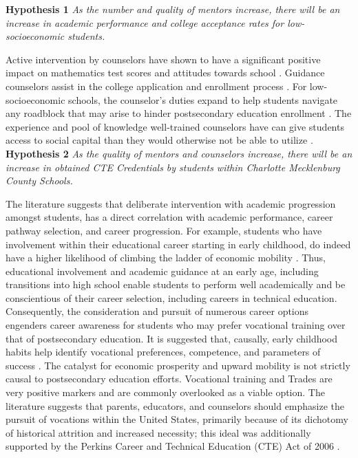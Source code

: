 \textbf{Hypothesis 1} \textit{As the number and quality of mentors increase, there will be an increase in academic performance and college acceptance rates for low-socioeconomic students.}

Active intervention by counselors have shown to have a significant positive impact on mathematics test scores and attitudes towards school \parencite[][]{lee1993}. 
Guidance counselors assist in the college application and enrollment process \parencite[][]{deslonde2018high,tang2019high}.
For low-socioeconomic schools, the counselor's duties expand to help students navigate any roadblock that may arise to hinder postsecondary education enrollment \parencite{farmer2006, deslonde2018high}. 
The experience and pool of knowledge well-trained counselors have can give students access to social capital than they would otherwise not be able to utilize \parencite{tang2019high}.
\\


\textbf{Hypothesis 2} \textit{As the quality of mentors and counselors increase, there will be an increase in obtained CTE Credentials by students within Charlotte Mecklenburg County Schools.}

The literature suggests that deliberate intervention with academic progression amongst students, has a direct correlation with academic performance, career pathway selection, and career progression. 
For example, students who have involvement within their educational career starting in early childhood, do indeed have a higher likelihood of climbing the ladder of economic mobility \parencite[][]{magnuson2000}.
Thus, educational involvement and academic guidance at an early age, including transitions into high school enable students to perform well academically and be conscientious of their career selection, including careers in technical education. 
Consequently, the consideration and pursuit of numerous career options engenders career awareness for students who may prefer vocational training over that of postsecondary education. 
It is suggested that, causally, early childhood habits help identify vocational preferences, competence, and parameters of success \parencite[][]{magnuson2000}.
The catalyst for economic prosperity and upward mobility is not strictly causal to postsecondary education efforts. 
Vocational training and Trades are very positive markers and are commonly overlooked as a viable option. 
The literature suggests that parents, educators, and counselors should emphasize the pursuit of vocations within the United States, primarily because of its dichotomy of historical attrition and increased necessity; this ideal was additionally supported by the Perkins Career and Technical Education (CTE) Act of 2006 \parencite[][]{castellano2017}.

